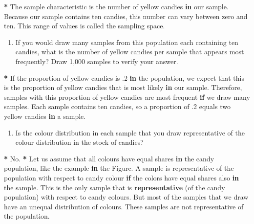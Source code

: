 \documentclass[a4paper]{book}
\newenvironment{Shaded}{\begin{snugshade}}{\end{snugshade}}
\newcommand{\KeywordTok}[1]{\textcolor[rgb]{0,0,0}{\textbf{#1}}}
\newcommand{\DecValTok}[1]{\textcolor[rgb]{0.00,0.00,0.00}{#1}}
\newcommand{\StringTok}[1]{\textcolor[rgb]{0.00,0.00,0.00}{#1}}
\newcommand{\ControlFlowTok}[1]{\textcolor[rgb]{0.00,0.00,0.00}{\textbf{#1}}}
\newcommand{\OperatorTok}[1]{\textcolor[rgb]{0.00,0.00,0.00}{\textbf{#1}}}
\newcommand{\NormalTok}[1]{#1}
\providecommand{\tightlist}{%
  \setlength{\itemsep}{0pt}\setlength{\parskip}{0pt}}
\theoremstyle{definition}
\theoremstyle{definition}
\theoremstyle{definition}
\theoremstyle{remark}
\begin{document}
\begin{Shaded}
\begin{Highlighting}[]
\OperatorTok{*}\StringTok{ }\NormalTok{The sample characteristic is the number of yellow candies }\ControlFlowTok{in}\NormalTok{ our sample.}
\NormalTok{Because our sample contains ten candies, this number can vary between zero and}
\NormalTok{ten. This range of values is called the sampling space.}
\end{Highlighting}
\end{Shaded}

\begin{enumerate}
\def\labelenumi{\arabic{enumi}.}
\setcounter{enumi}{3}
\tightlist
\item
  If you would draw many samples from this population each containing
  ten candies, what is the number of yellow candies per sample that
  appears most frequently? Draw 1,000 samples to verify your answer.
\end{enumerate}

\begin{Shaded}
\begin{Highlighting}[]
\OperatorTok{*}\StringTok{ }\NormalTok{If the proportion of yellow candies is .}\DecValTok{2} \ControlFlowTok{in}\NormalTok{ the population, we expect that}
\NormalTok{this is the proportion of yellow candies that is most likely }\ControlFlowTok{in}\NormalTok{ our sample.}
\NormalTok{Therefore, samples with this proportion of yellow candies are most frequent }\ControlFlowTok{if}
\NormalTok{we draw many samples. Each sample contains ten candies, so a proportion of .}\DecValTok{2}
\NormalTok{equals two yellow candies }\ControlFlowTok{in}\NormalTok{ a sample.}
\end{Highlighting}
\end{Shaded}

\begin{enumerate}
\def\labelenumi{\arabic{enumi}.}
\setcounter{enumi}{4}
\tightlist
\item
  Is the colour distribution in each sample that you draw representative
  of the colour distribution in the stock of candies?
\end{enumerate}

\begin{Shaded}
\begin{Highlighting}[]
\OperatorTok{*}\StringTok{ }\NormalTok{No. }
\OperatorTok{*}\StringTok{ }\NormalTok{Let us assume that all colours have equal shares }\ControlFlowTok{in}\NormalTok{ the candy population,}
\NormalTok{like the example }\ControlFlowTok{in}\NormalTok{ the Figure. A sample is representative of the population}
\NormalTok{with respect to candy colour }\ControlFlowTok{if}\NormalTok{ the colors have equal shares also }\ControlFlowTok{in}\NormalTok{ the}
\NormalTok{sample. This is the only sample that is }\KeywordTok{representative}\NormalTok{ (of the candy}
\NormalTok{population) with respect to candy colours. But most of the samples that we}
\NormalTok{draw have an unequal distribution of colours. These samples are not}
\NormalTok{representative of the population.}
\end{Highlighting}
\end{Shaded}
\end{document}
